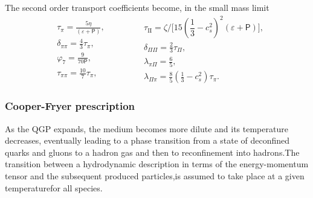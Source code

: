 The second order transport coefficients become, in the small mass limit
\begin{equation*}
    \begin{split}
         &\tau_{\pi} =\frac{5 \eta}{(\varepsilon+\textsf{P})},\\
         &\delta_{\pi \pi} =\frac{4}{3} \tau_{\pi},\\
         &\varphi_{7} =\frac{9}{70 \textsf{P}},\\
         &\tau_{\pi \pi} =\frac{10}{7} \tau_{\pi},
    \end{split}\quad\quad\quad
    \begin{split} 
        &\tau_{\mathrm{II}}=\zeta\Big/\Big[ 15\left(\dfrac{1}{3}-c_{s}^{2}\right)^{2}(\varepsilon+\textsf{P})\Big],\\
        &\delta_{\Pi \Pi} =\frac{2}{3} \tau_{\Pi},\\
        &\lambda_{\pi \Pi} =\frac{6}{5},\\
        &\lambda_{\Pi \pi} =\frac{8}{5}\left(\frac{1}{3}-c_{s}^{2}\right) \tau_\pi.
    \end{split}
\end{equation*}


\subsubsection*{Cooper-Fryer prescription}
As the {\sffamily QGP} expands, the medium becomes more dilute and its temperature decreases, eventually leading to a phase transition from a state of deconfined quarks and gluons to a hadron gas and then to reconfinement into hadrons.The transition between a hydrodynamic description in terms of the energy-momentum tensor and the subsequent produced particles,is assumed to take place at a given temperaturefor all species. \\

